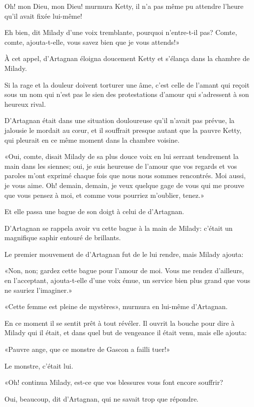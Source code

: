 \speak  Oh! mon Dieu, mon Dieu! murmura Ketty, il n'a pas même pu attendre l'heure qu'il avait fixée lui-même! 

\speak  Eh bien, dit Milady d'une voix tremblante, pourquoi n'entre-t-il pas? Comte, comte, ajouta-t-elle, vous savez bien que je vous attends!» 

À cet appel, d'Artagnan éloigna doucement Ketty et s'élança dans la chambre de Milady. 

Si la rage et la douleur doivent torturer une âme, c'est celle de l'amant qui reçoit sous un nom qui n'est pas le sien des protestations d'amour qui s'adressent à son heureux rival. 

D'Artagnan était dans une situation douloureuse qu'il n'avait pas prévue, la jalousie le mordait au cœur, et il souffrait presque autant que la pauvre Ketty, qui pleurait en ce même moment dans la chambre voisine. 

«Oui, comte, disait Milady de sa plus douce voix en lui serrant tendrement la main dans les siennes; oui, je suis heureuse de l'amour que vos regards et vos paroles m'ont exprimé chaque fois que nous nous sommes rencontrés. Moi aussi, je vous aime. Oh! demain, demain, je veux quelque gage de vous qui me prouve que vous pensez à moi, et comme vous pourriez m'oublier, tenez.» 

Et elle passa une bague de son doigt à celui de d'Artagnan. 

D'Artagnan se rappela avoir vu cette bague à la main de Milady: c'était un magnifique saphir entouré de brillants. 

Le premier mouvement de d'Artagnan fut de le lui rendre, mais Milady ajouta: 

«Non, non; gardez cette bague pour l'amour de moi. Vous me rendez d'ailleurs, en l'acceptant, ajouta-t-elle d'une voix émue, un service bien plus grand que vous ne sauriez l'imaginer.» 

«Cette femme est pleine de mystères», murmura en lui-même d'Artagnan. 

En ce moment il se sentit prêt à tout révéler. Il ouvrit la bouche pour dire à Milady qui il était, et dans quel but de vengeance il était venu, mais elle ajouta: 

«Pauvre ange, que ce monstre de Gascon a failli tuer!» 

Le monstre, c'était lui. 

«Oh! continua Milady, est-ce que vos blessures vous font encore souffrir? 

\speak  Oui, beaucoup, dit d'Artagnan, qui ne savait trop que répondre. 

